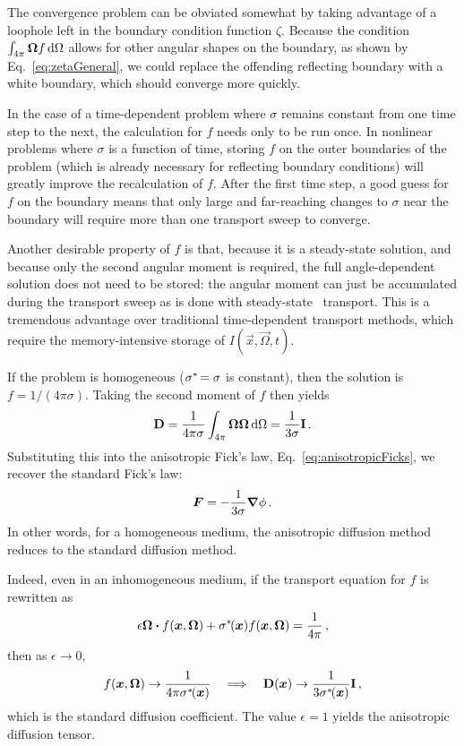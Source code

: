 The convergence problem can be obviated somewhat by taking advantage of a
loophole left in the boundary condition function $\zeta$. Because the condition
$\int_{4\pi} \bm{\Omega} f \mathop{}\!\mathrm{d}\Omega$ allows for other angular shapes on the
boundary, as shown by Eq.~\eqref{eq:zetaGeneral}, we could replace the
offending reflecting boundary with a white boundary, which should converge more
quickly.

In the case of a time-dependent problem where $\sigma$ remains constant from one
time step to the next, the calculation for $f$ needs only to be run once. In
nonlinear problems where $\sigma$ is a function of time, storing $f$ on the
outer boundaries of the problem (which is already necessary for reflecting
boundary conditions) will greatly improve the recalculation of $f$. After the
first time step, a good guess for $f$ on the boundary means that only large and
far-reaching changes to $\sigma$ near the boundary will require more than one
transport sweep to converge.

Another desirable property of $f$ is that, because it is a steady-state
solution, and because only the second angular moment
is required, the
full angle-dependent solution does not need to be stored: the angular moment can
just be accumulated during the transport sweep as is done with steady-state \SN\
transport. This is a tremendous
advantage over traditional time-dependent transport methods, which require the
memory-intensive storage of $I(\vec{x},\vec{\Omega},t)$.

If the problem is homogeneous ($\sigma^{*\!}=\sigma$ is constant), then the solution is
$f=1/(4\pi\sigma)$. Taking the second moment of $f$ then yields
\begin{equation*}
  \mathbf{D} = \frac{1}{4\pi\sigma} \int_{4\pi} \bm{\Omega} \bm{\Omega} \mathop{}\!\mathrm{d} \Omega
  = \frac{1}{3\sigma} \mathbf{I}\,.
\end{equation*}
Substituting this into the anisotropic Fick's law,
Eq.~\eqref{eq:anisotropicFicks}, we recover the standard Fick's law:
\begin{equation*}
  \bm{F} = - \frac{1}{3\sigma} \bm{\nabla} \phi\,.
\end{equation*}
In other words, for a homogeneous medium, the anisotropic diffusion method
reduces to the standard diffusion method.

Indeed, even in an inhomogeneous medium, if the transport equation for $f$ is
rewritten as
\begin{equation*}
  \epsilon \bm{\Omega}\bm{\cdot} f(\bm{x},\bm{\Omega})
  + \sigma^{*\!}(\bm{x})  f(\bm{x},\bm{\Omega}) = \frac{1}{4\pi}\,,
\end{equation*}
then as $\epsilon\to 0$,
\begin{equation*}
  f(\bm{x}, \bm{\Omega}) \to \frac{1}{4\pi \sigma^{*\!}(\bm{x})} \quad \Longrightarrow \quad
  \mathbf{D}(\bm{x}) \to \frac{1}{3 \sigma^{*\!}(\bm{x})} \mathbf{I}\,,
\end{equation*}
which is the standard diffusion coefficient. The value $\epsilon=1$ yields the
anisotropic diffusion tensor.

